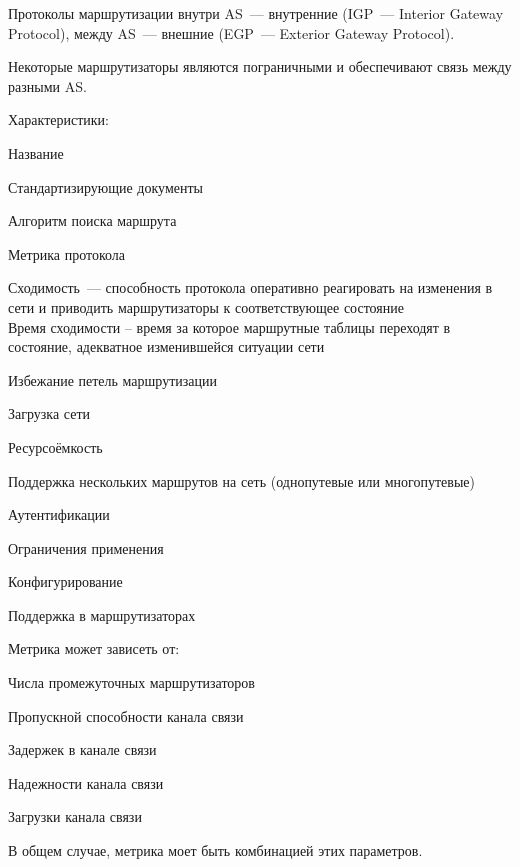 Протоколы маршрутизации внутри AS~--- внутренние (IGP~--- Interior Gateway Protocol), между AS~--- внешние (EGP~--- Exterior Gateway Protocol).

Некоторые маршрутизаторы являются пограничными и обеспечивают связь между разными AS.


Характеристики:
\begin{MyItemize}
    \item Название 
    \item Стандартизирующие документы
    \item Алгоритм поиска маршрута
    \item Метрика протокола
    \item Сходимость~--- способность протокола оперативно реагировать на изменения в сети и приводить маршрутизаторы к соответствующее состояние\\
    Время сходимости – время за которое маршрутные таблицы переходят в состояние, адекватное изменившейся ситуации сети
    \item Избежание петель маршрутизации
    \item Загрузка сети
    \item Ресурсоёмкость
    \item Поддержка нескольких маршрутов на сеть (однопутевые или многопутевые)
    \item Аутентификации
    \item Ограничения применения
    \item Конфигурирование
    \item Поддержка в маршрутизаторах
\end{MyItemize}


Метрика может зависеть от:
\begin{MyItemize}
    \item Числа промежуточных маршрутизаторов
    \item Пропускной способности канала связи
    \item Задержек в канале связи
    \item Надежности канала связи
    \item Загрузки канала связи
\end{MyItemize}

В общем случае, метрика моет быть комбинацией этих параметров.


